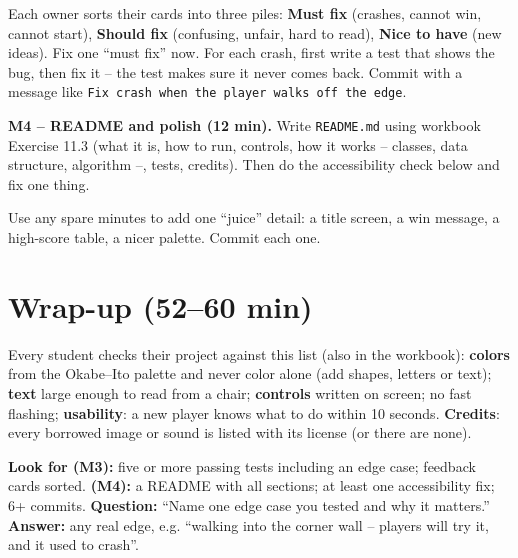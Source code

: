 \begin{bughunt}
Each owner sorts their cards into three piles: \textbf{Must fix} (crashes, cannot win, cannot start), \textbf{Should fix} (confusing, unfair, hard to read), \textbf{Nice to have} (new ideas). Fix one \enquote{must fix} now. For each crash, first write a test that shows the bug, then fix it -- the test makes sure it never comes back. Commit with a message like \texttt{Fix crash when the player walks off the edge}.
\end{bughunt}

\textbf{M4 -- README and polish (12 min).} Write \texttt{README.md} using workbook Exercise 11.3 (what it is, how to run, controls, how it works -- classes, data structure, algorithm --, tests, credits). Then do the accessibility check below and fix one thing.

\begin{freebuild}
Use any spare minutes to add one \enquote{juice} detail: a title screen, a win message, a high-score table, a nicer palette. Commit each one.
\end{freebuild}

\section{Wrap-up (52--60 min)}
\begin{safety}
Every student checks their project against this list (also in the workbook): \textbf{colors} from the Okabe--Ito palette and never color alone (add shapes, letters or text); \textbf{text} large enough to read from a chair; \textbf{controls} written on screen; no fast flashing; \textbf{usability}: a new player knows what to do within 10 seconds. \textbf{Credits}: every borrowed image or sound is listed with its license (or there are none).
\end{safety}

\begin{formativecheck}
\textbf{Look for (M3):} five or more passing tests including an edge case; feedback cards sorted. \textbf{(M4):} a README with all sections; at least one accessibility fix; 6+ commits.
\textbf{Question:} \enquote{Name one edge case you tested and why it matters.}
\textbf{Answer:} any real edge, e.g. \enquote{walking into the corner wall -- players will try it, and it used to crash}.
\end{formativecheck}

